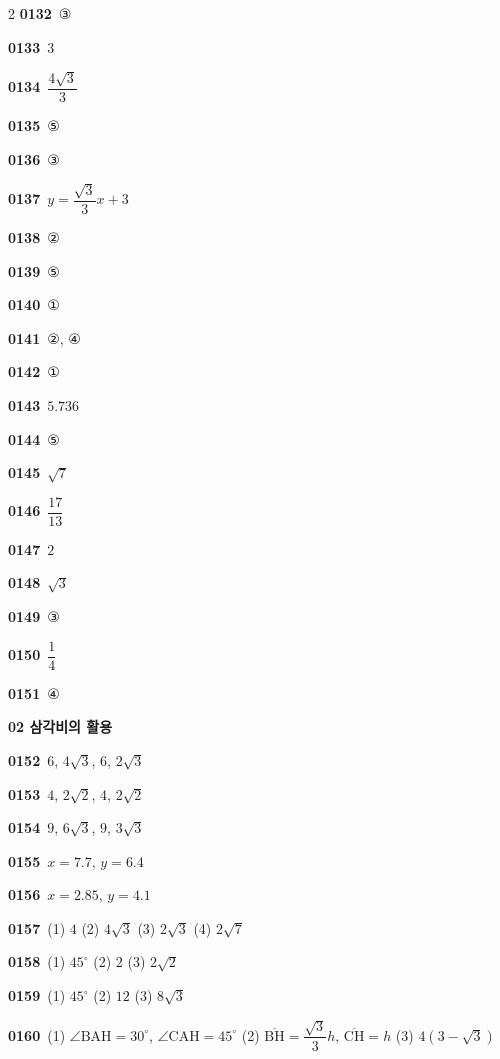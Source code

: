 \documentclass[10pt,a4paper]{article}
\newcommand{\pt}[1]{\mathrm{#1}}
\newcommand{\seg}[1]{\overline{\mathrm{#1}}}
\begin{document}
\begin{multicols}{2}
\noindent\textbf{0132}\ ③\par
\noindent\textbf{0133}\ $3$\par
\noindent\textbf{0134}\ $\dfrac{4\sqrt{3}}{3}$\par
\noindent\textbf{0135}\ ⑤\par
\noindent\textbf{0136}\ ③\par
\noindent\textbf{0137}\ $y=\dfrac{\sqrt{3}}{3}x+3$\par
\noindent\textbf{0138}\ ②\par
\noindent\textbf{0139}\ ⑤\par
\noindent\textbf{0140}\ ①\par
\noindent\textbf{0141}\ ②, ④\par
\noindent\textbf{0142}\ ①\par
\noindent\textbf{0143}\ $5.736$\par
\noindent\textbf{0144}\ ⑤\par
\noindent\textbf{0145}\ $\sqrt{7}$\par
\noindent\textbf{0146}\ $\dfrac{17}{13}$\par
\noindent\textbf{0147}\ $2$\par
\noindent\textbf{0148}\ $\sqrt{3}$\par
\noindent\textbf{0149}\ ③\par
\noindent\textbf{0150}\ $\dfrac{1}{4}$\par
\noindent\textbf{0151}\ ④\par
\noindent\textbf{02 삼각비의 활용}\par\smallskip
\noindent\textbf{0152}\ $6$, $4\sqrt{3}$, $6$, $2\sqrt{3}$\par
\noindent\textbf{0153}\ $4$, $2\sqrt{2}$, $4$, $2\sqrt{2}$\par
\noindent\textbf{0154}\ $9$, $6\sqrt{3}$, $9$, $3\sqrt{3}$\par
\noindent\textbf{0155}\ $x=7.7$, $y=6.4$\par
\noindent\textbf{0156}\ $x=2.85$, $y=4.1$\par
\noindent\textbf{0157}\ (1) $4$ (2) $4\sqrt{3}$ (3) $2\sqrt{3}$ (4) $2\sqrt{7}$\par
\noindent\textbf{0158}\ (1) $45^\circ$ (2) $2$ (3) $2\sqrt{2}$\par
\noindent\textbf{0159}\ (1) $45^\circ$ (2) $12$ (3) $8\sqrt{3}$\par
\noindent\textbf{0160}\ (1) $\angle\pt{BAH}=30^\circ$, $\angle\pt{CAH}=45^\circ$ (2) $\seg{BH}=\dfrac{\sqrt{3}}{3}h$, $\seg{CH}=h$ (3) $4(3-\sqrt{3})$\par

\end{multicols}
\end{document}
